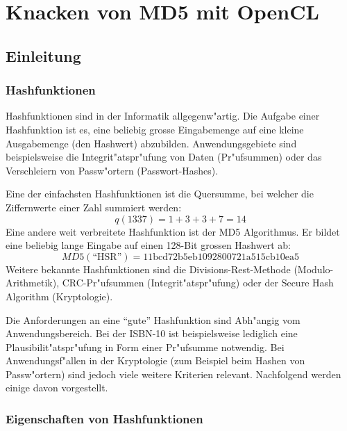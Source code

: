 \chapter{Knacken von MD5 mit OpenCL}
\begin{refsection}



\section{Einleitung}


\subsection{Hashfunktionen}

Hashfunktionen sind in der Informatik allgegenw"artig. Die Aufgabe einer
Hashfunktion ist es, eine beliebig grosse Eingabemenge auf eine kleine
Ausgabemenge (den Hashwert) abzubilden. Anwendungsgebiete sind beispielsweise
die Integrit"atspr"ufung von Daten (Pr"ufsummen) oder das Verschleiern von
Passw"ortern (Passwort-Hashes).

Eine der einfachsten Hashfunktionen ist die Quersumme, bei welcher die
Ziffernwerte einer Zahl summiert werden:
\[
	q(1337) = 1 + 3 + 3 + 7 = 14
\]
Eine andere weit verbreitete Hashfunktion ist der MD5 Algorithmus. Er bildet
eine beliebig lange Eingabe auf einen 128-Bit grossen Hashwert ab:
\[
	MD5(\textrm{``HSR''}) = \textrm{11bcd72b5eb1092800721a515cb10ea5}
\]
Weitere bekannte Hashfunktionen sind die Divisions-Rest-Methode
(Modulo-Arithmetik), CRC-Pr"ufsummen (Integrit"atspr"ufung) oder der Secure Hash
Algorithm (Kryptologie).

Die Anforderungen an eine ``gute'' Hashfunktion sind Abh"angig vom
Anwendungsbereich. Bei der ISBN-10 ist beispielsweise lediglich eine
Plausibilit"atspr"ufung in Form einer Pr"ufsumme notwendig. Bei
Anwendungsf"allen in der Kryptologie (zum Beispiel beim Hashen von Passw"ortern)
sind jedoch viele weitere Kriterien relevant. Nachfolgend werden einige davon
vorgestellt.

\subsection{Eigenschaften von Hashfunktionen}
\label{crypto:hashfunktionen:eigenschaften}


\end{refsection}
